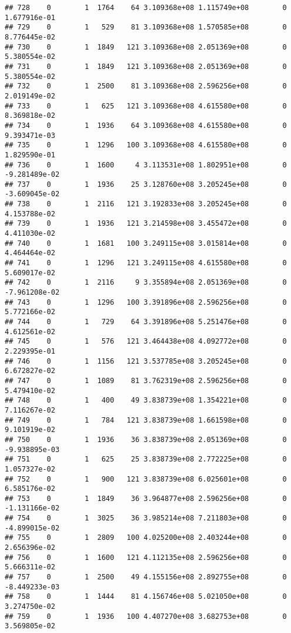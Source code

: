 \documentclass[
]{article}
\begin{document}
\begin{enumerate}
\begin{verbatim}
## 728    0        1  1764    64 3.109368e+08 1.115749e+08        0  1.677916e-01
## 729    0        1   529    81 3.109368e+08 1.570585e+08        0  8.776445e-02
## 730    0        1  1849   121 3.109368e+08 2.051369e+08        0  5.380554e-02
## 731    0        1  1849   121 3.109368e+08 2.051369e+08        0  5.380554e-02
## 732    0        1  2500    81 3.109368e+08 2.596256e+08        0  2.019149e-02
## 733    0        1   625   121 3.109368e+08 4.615580e+08        0  8.369818e-02
## 734    0        1  1936    64 3.109368e+08 4.615580e+08        0  9.393471e-03
## 735    0        1  1296   100 3.109368e+08 4.615580e+08        0  1.829590e-01
## 736    0        1  1600     4 3.113531e+08 1.802951e+08        0 -9.281489e-02
## 737    0        1  1936    25 3.128760e+08 3.205245e+08        0 -3.609045e-02
## 738    0        1  2116   121 3.192833e+08 3.205245e+08        0  4.153788e-02
## 739    0        1  1936   121 3.214598e+08 3.455472e+08        0  4.411030e-02
## 740    0        1  1681   100 3.249115e+08 3.015814e+08        0  4.464464e-02
## 741    0        1  1296   121 3.249115e+08 4.615580e+08        0  5.609017e-02
## 742    0        1  2116     9 3.355894e+08 2.051369e+08        0 -7.961208e-02
## 743    0        1  1296   100 3.391896e+08 2.596256e+08        0  5.772166e-02
## 744    0        1   729    64 3.391896e+08 5.251476e+08        0  4.612561e-02
## 745    0        1   576   121 3.464438e+08 4.092772e+08        0  2.229395e-01
## 746    0        1  1156   121 3.537785e+08 3.205245e+08        0  6.672827e-02
## 747    0        1  1089    81 3.762319e+08 2.596256e+08        0  5.479410e-02
## 748    0        1   400    49 3.838739e+08 1.354221e+08        0  7.116267e-02
## 749    0        1   784   121 3.838739e+08 1.661598e+08        0  9.101919e-02
## 750    0        1  1936    36 3.838739e+08 2.051369e+08        0 -9.938895e-03
## 751    0        1   625    25 3.838739e+08 2.772225e+08        0  1.057327e-02
## 752    0        1   900   121 3.838739e+08 6.025601e+08        0  6.585176e-02
## 753    0        1  1849    36 3.964877e+08 2.596256e+08        0 -1.131166e-02
## 754    0        1  3025    36 3.985214e+08 7.211803e+08        0 -4.899015e-02
## 755    0        1  2809   100 4.025200e+08 2.403244e+08        0  2.656396e-02
## 756    0        1  1600   121 4.112135e+08 2.596256e+08        0  5.666311e-02
## 757    0        1  2500    49 4.155156e+08 2.892755e+08        0 -8.449233e-03
## 758    0        1  1444    81 4.156746e+08 5.021050e+08        0  3.274750e-02
## 759    0        1  1936   100 4.407270e+08 3.682753e+08        0  3.569805e-02

\end{verbatim}
\end{enumerate}
\end{document}
